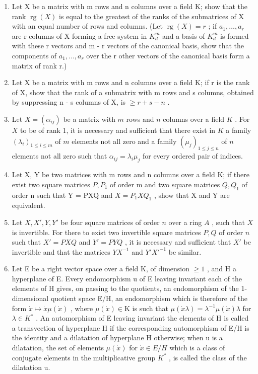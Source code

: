 \begin{enumerate}
\def\labelenumi{\arabic{enumi}.}
\setcounter{enumi}{5}
\item
  Let X be a matrix with m rows and n columns over a field K; show that the rank \(\operatorname{rg}(X)\) is equal to the greatest of the ranks of the submatrices of X with an equal number of rows and columns. (Let \(\operatorname{rg}(X) = r\) ; if \(a_{1}, \ldots, a_{r}\) are r columns of X forming a free system in \(K_{d}^{m}\) and a basis of \(K_{d}^{m}\) is formed with these r vectors and m - r vectors of the canonical basis, show that the components of \(a_{1}, \ldots, a_{r}\) over the r other vectors of the canonical basis form a matrix of rank r.)
\item
  Let X be a matrix with m rows and n columns over a field K; if r is the rank of X, show that the rank of a submatrix with m rows and s columns, obtained by suppressing n - s columns of X, is \(\geqslant r + s - n\) .
\item
  Let \(X = (\alpha_{ij})\) be a matrix with \(m\) rows and \(n\) columns over a field \(K\) . For \(X\) to be of rank 1, it is necessary and sufficient that there exist in \(K\) a family \((\lambda_i)_{1 \leqslant i \leqslant m}\) of \(m\) elements not all zero and a family \((\mu_j)_{1 \leqslant j \leqslant n}\) of \(n\) elements not all zero such that \(\alpha_{ij} = \lambda_i \mu_j\) for every ordered pair of indices.
\item
  Let X, Y be two matrices with m rows and n columns over a field K; if there exist two square matrices \(P, P_{1}\) of order m and two square matrices \(Q, Q_{1}\) of order n such that Y = PXQ and \(X = P_{1}XQ_{1}\) , show that X and Y are equivalent.
\item
  Let \(X, X', Y, Y'\) be four square matrices of order \(n\) over a ring \(A\) , such that \(X\) is invertible. For there to exist two invertible square matrices \(P, Q\) of order \(n\) such that \(X' = PXQ\) and \(Y' = PYQ\) , it is necessary and sufficient that \(X'\) be invertible and that the matrices \(YX^{-1}\) and \(Y'X'^{-1}\) be similar.
\item
  Let E be a right vector space over a field K, of dimension \(\geqslant1\) , and H a hyperplane of E. Every endomorphism u of E leaving invariant each of the elements of H gives, on passing to the quotients, an endomorphism of the 1-dimensional quotient space E/H, an endomorphism which is therefore of the form \(\dot{x}\mapsto\dot{x}\mu(\dot{x})\) , where \(\mu(\dot{x})\in\mathrm{K}\) is such that \(\mu(\dot{x}\lambda)=\lambda^{-1}\mu(\dot{x})\lambda\) for \(\lambda\in K^{*}\) . An automorphism of E leaving invariant the elements of H is called a transvection of hyperplane H if the corresponding automorphism of E/H is the identity and a dilatation of hyperplane H otherwise; when u is a dilatation, the set of elements \(\mu(\dot{x})\) for \(\dot{x}\in E/H\) which is a class of conjugate elements in the multiplicative group \(K^{*}\) , is called the class of the dilatation u.
\end{enumerate}

